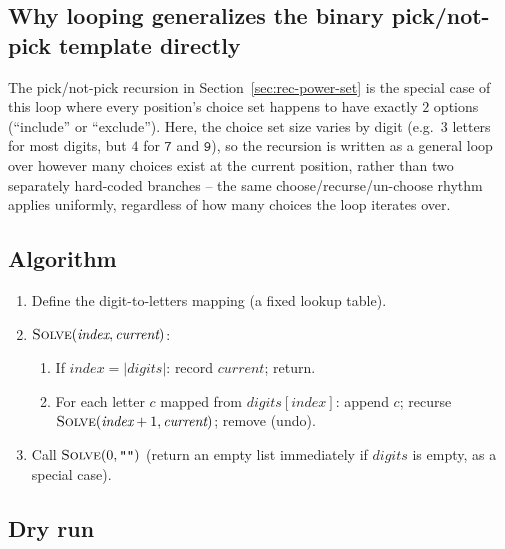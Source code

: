 \subsection*{Why looping generalizes the binary pick/not-pick template directly}

The pick/not-pick recursion in Section~\ref{sec:rec-power-set} is the
special case of this loop where every position's choice set happens to
have exactly $2$ options (``include'' or ``exclude''). Here, the choice
set size varies by digit (e.g.\ $3$ letters for most digits, but $4$ for
$\texttt{7}$ and $\texttt{9}$), so the recursion is written as a general
loop over however many choices exist at the current position, rather
than two separately hard-coded branches -- the same choose/recurse/un-choose
rhythm applies uniformly, regardless of how many choices the loop
iterates over.

\subsection*{Algorithm}

\begin{enumerate}
  \item Define the digit-to-letters mapping (a fixed lookup table).
  \item $\textsc{Solve}(\textit{index}, \textit{current})$:
  \begin{enumerate}
    \item If $\textit{index} = |\textit{digits}|$: record
          $\textit{current}$; return.
    \item For each letter $c$ mapped from
          $\textit{digits}[\textit{index}]$: append $c$; recurse
          $\textsc{Solve}(\textit{index}+1, \textit{current})$; remove
          (undo).
  \end{enumerate}
  \item Call $\textsc{Solve}(0, \texttt{""})$ (return an empty list
        immediately if $\textit{digits}$ is empty, as a special case).
\end{enumerate}

\subsection*{Dry run}


